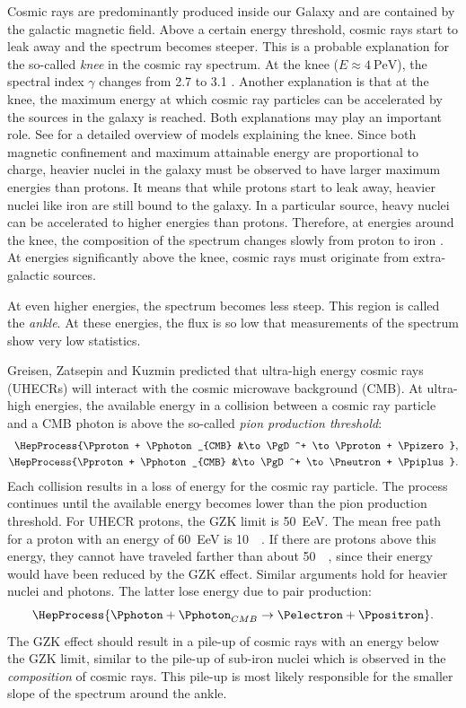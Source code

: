 Cosmic rays are predominantly produced inside our Galaxy and are contained by
the galactic magnetic field.  Above a certain energy threshold, cosmic rays
start to leak away and the spectrum becomes steeper.  This is a probable
explanation for the so-called \emph{knee} in the cosmic ray spectrum. At the
knee ($E \approx \SI{4}{\peta\electronvolt}$), the spectral index $\gamma$
changes from \num{2.7} to \num{3.1} \cite{Amenomori:2008}.
Another explanation is that at the knee, the maximum energy at which cosmic ray
particles can be accelerated by the sources in the galaxy is reached.
Both explanations may play an important role.  See \textcite{Hoerandel:2004} for
a detailed overview of models explaining the knee.  Since both magnetic
confinement and maximum attainable energy are proportional to charge, heavier
nuclei in the galaxy must be observed to have larger maximum energies than
protons.  It means that while protons start to leak away, heavier nuclei like
iron are still bound to the galaxy.  In a particular source, heavy nuclei can be
accelerated to higher energies than protons.  Therefore, at energies around the
knee, the composition of the spectrum changes slowly from proton to iron \parencite{Bird:1993}.
At energies significantly above the knee, cosmic rays must originate from
extra-galactic sources.

At even higher energies, the spectrum becomes less steep.  This region is
called the \emph{ankle}.  At these energies, the flux is so low that
measurements of the spectrum show very low statistics.

Greisen, Zatsepin and Kuzmin predicted that ultra-high energy cosmic rays
(UHECRs) will interact with the cosmic microwave background (CMB).  At
ultra-high energies, the available energy in a collision between a cosmic ray
particle and a CMB photon is above the so-called \emph{pion production
threshold}:
\begin{align}
\HepProcess{\Pproton + \Pphoton_{CMB} &\to \PgD^+ \to \Pproton +
\Ppizero}, \\
\HepProcess{\Pproton + \Pphoton_{CMB} &\to \PgD^+ \to \Pneutron +
\Ppiplus}.
\end{align}
Each collision results in a loss of energy for the cosmic ray particle. The
process continues until the available energy becomes lower than the pion
production threshold.  For UHECR protons, the GZK limit is
\SI{50}{\exa\electronvolt}. The mean free path for a proton with an energy of
\SI{60}{\exa\electronvolt} is \SI{10}{\mega\parsec}.  If there are protons above
this energy, they cannot have traveled farther than about \SI{50}{\mega\parsec},
since their energy would have been reduced by the GZK effect.  Similar arguments
hold for heavier nuclei and photons. The latter lose energy due to pair
production:
\begin{equation}
\HepProcess{\Pphoton + \Pphoton_{CMB} \to \Pelectron + \Ppositron}.
\end{equation}
The GZK effect should result in a pile-up of cosmic rays with an energy below
the GZK limit, similar to the pile-up of sub-iron nuclei which is observed in
the \emph{composition} of cosmic rays. This pile-up is most likely responsible
for the smaller slope of the spectrum around the ankle.

